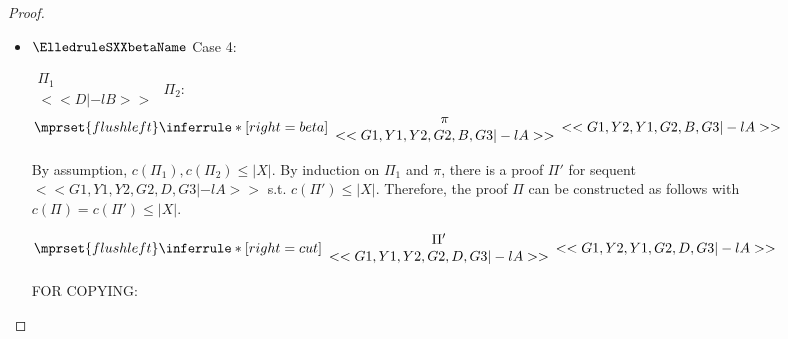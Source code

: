 \begin{proof}
\begin{enumerate}
\begin{itemize}
    \item $\ElledruleSXXbetaName$ Case 4:
      \begin{center}
        \scriptsize
        \begin{math}
          \begin{array}{c}
            \Pi_1 \\
            {<<D |-l B>>}
          \end{array}
        \end{math}
        \qquad\qquad
        $\Pi_2$:
        \begin{math}
          $$\mprset{flushleft}
          \inferrule* [right={\tiny beta}] {
            {
              \begin{array}{c}
                \pi \\
                {<<G1, Y1, Y2, G2, B, G3 |-l A>>}
              \end{array}
            }
          }{<<G1, Y2, Y1, G2, B, G3 |-l A>>}
        \end{math}
      \end{center}
      By assumption, $c(\Pi_1),c(\Pi_2)\leq |X|$. By induction on $\Pi_1$ and $\pi$, there is
      a proof $\Pi'$ for sequent $<<G1, Y1, Y2, G2, D, G3 |-l A>>$ s.t. $c(\Pi') \leq |X|$.
      Therefore, the proof $\Pi$ can be constructed as follows with
      $c(\Pi) = c(\Pi') \leq |X|$.
      \begin{center}
        \scriptsize
        \begin{math}
          $$\mprset{flushleft}
          \inferrule* [right={\tiny cut}] {
            {
              \begin{array}{cc}
                \Pi' \\
                {<<G1, Y1, Y2, G2, D, G3 |-l A>>}
              \end{array}
            }
          }{<<G1, Y2, Y1, G2, D, G3 |-l A>>}
        \end{math}
      \end{center}








  FOR COPYING:





  \end{itemize}






  \end{enumerate}
\end{proof}
















